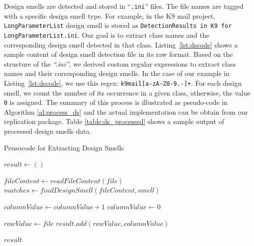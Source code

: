\documentclass[AMA,Times1COL]{WileyNJDv5} %
\begin{document}
	Design smells are detected and stored in ``{\tt .ini}'' files. The file names are tagged with a specific design smell type. For example, in the K9 mail project, {\tt LongParameterList} design smell is stored as {\tt DetectionResults in K9 for LongParameterList.ini}. Our goal is to extract class names and the corresponding design smell detected in that class. Listing~\ref{lst:dscode} shows a sample content of design smell detection file in its raw format. Based on the structure of the \textit{``.ini''}, we derived custom regular expressions to extract class names and their corresponding design smells. In the case of our example in Listing~\ref{lst:dscode}, we use this regex: {\tt k9mail[a-zA-Z0-9.-]+}. For each design smell, we count the number of its occurrence in a given class, otherwise, the value {\tt 0} is assigned\cite{ogenrwot2021integration, ogenrwot, ogenrwot2021using}. The summary of this process is illustrated as pseudo-code in Algorithm \ref{al:process_ds} and the actual implementation can be obtain from our replication package. Table \ref{table:ds_processed} shows a sample output of processed design smells data.
	\begin{algorithm}
		\caption{\enskip Peusocode for Extracting Design Smells}\label{alg1}
		\begin{algorithmic}
			\State $result \leftarrow ( )$
			
			\State $fileContent \leftarrow readFileContent(file)$
			\State $matches \leftarrow findDesignSmell(fileContent, smell)$
			
			\State $columnValue \leftarrow columnValue + 1$
			\Else
			\State $columnValue \leftarrow 0$
			\EndIf
			
			\State $rowValue \leftarrow file$
			\State $result.add(rowValue, columnValue)$
			\EndFor
			\EndFor
			
			\State \Return $result$
			\EndProcedure
		\end{algorithmic}
		\label{al:process_ds}
	\end{algorithm}
	
\end{document}
